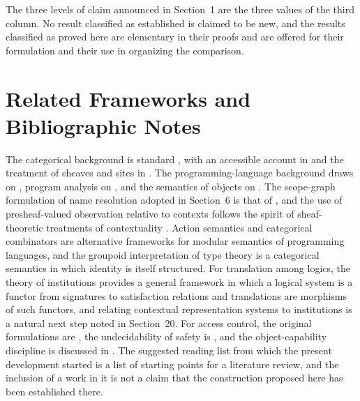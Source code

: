 The three levels of claim announced in Section~1 are the three values of the third column. No result classified as established is claimed to be new, and the results classified as proved here are elementary in their proofs and are offered for their formulation and their use in organizing the comparison.

\section{Related Frameworks and Bibliographic Notes}

The categorical background is standard \cite{maclane,borceux}, with an accessible account in \cite{awodey} and the treatment of sheaves and sites in \cite{maclanemoerdijk}. The programming-language background draws on \cite{harper,pierce}, program analysis on \cite{nielson}, and the semantics of objects on \cite{abadicardelli}. The scope-graph formulation of name resolution adopted in Section~6 is that of \cite{scopegraphs}, and the use of presheaf-valued observation relative to contexts follows the spirit of sheaf-theoretic treatments of contextuality \cite{abramsky}. Action semantics \cite{mosses} and categorical combinators \cite{curien} are alternative frameworks for modular semantics of programming languages, and the groupoid interpretation of type theory \cite{hofmannstreicher} is a categorical semantics in which identity is itself structured. For translation among logics, the theory of institutions \cite{goguen} provides a general framework in which a logical system is a functor from signatures to satisfaction relations and translations are morphisms of such functors, and relating contextual representation systems to institutions is a natural next step noted in Section~20. For access control, the original formulations are \cite{lampson,dennisvanhorn}, the undecidability of safety is \cite{hru}, and the object-capability discipline is discussed in \cite{capmyths}. The suggested reading list from which the present development started is a list of starting points for a literature review, and the inclusion of a work in it is not a claim that the construction proposed here has been established there.

